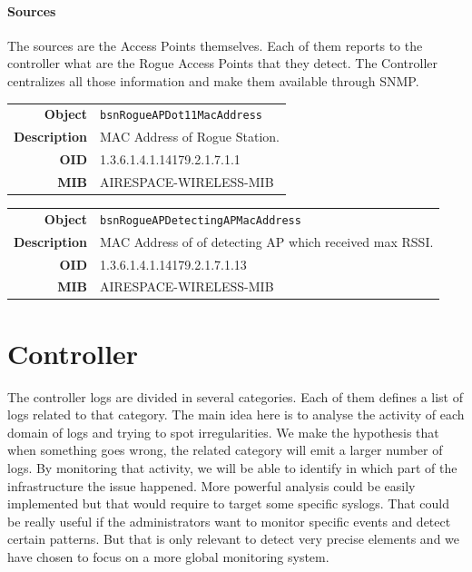\paragraph*{Sources} The sources are the Access Points themselves. Each of them reports to the controller what are the Rogue Access Points that they detect. The Controller centralizes all those information and make them available through SNMP.

\begin{tabular}{|r l|}
\hline
\textbf{Object} & \texttt{bsnRogueAPDot11MacAddress} \\
\textbf{Description} & \parbox{11cm}{MAC Address of Rogue Station.} \\
\textbf{OID} & 1.3.6.1.4.1.14179.2.1.7.1.1 \\
\textbf{MIB} & AIRESPACE-WIRELESS-MIB \\
\hline
\end{tabular}

\begin{tabular}{|r l|}
\hline
\textbf{Object} & \texttt{bsnRogueAPDetectingAPMacAddress} \\
\textbf{Description} & \parbox{11cm}{MAC Address of of detecting AP which received max RSSI.} \\
\textbf{OID} & 1.3.6.1.4.1.14179.2.1.7.1.13 \\
\textbf{MIB} & AIRESPACE-WIRELESS-MIB \\
\hline
\end{tabular}



\section{Controller}
The controller logs are divided in several categories. Each of them defines a list of logs related to that category. The main idea here is to analyse the activity of each domain of logs and trying to spot irregularities. We make the hypothesis that when something goes wrong, the related category will emit a larger number of logs. By monitoring that activity, we will be able to identify in which part of the infrastructure the issue happened. More powerful analysis could be easily implemented but that would require to target some specific syslogs. That could be really useful if the administrators want to monitor specific events and detect certain patterns. But that is only relevant to detect very precise elements and we have chosen to focus on a more global monitoring system.

